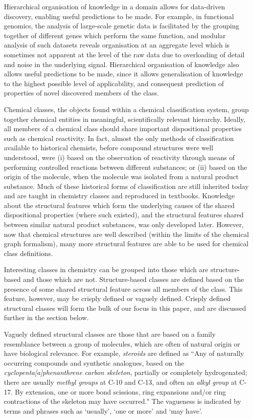 \documentclass[10pt]{bmc_article}
\newenvironment{bmcformat}{\baselineskip20pt\sloppy\setboolean{publ}{false}}{\baselineskip20pt\sloppy}
\begin{document}
\begin{bmcformat}
Hierarchical organisation of knowledge in a domain allows for data-driven discovery, enabling useful predictions to be made.  For example, in functional genomics, the analysis of large-scale genetic data is facilitated by the grouping together of different genes which perform the same function, and modular analysis of such datasets reveals organisation at an aggregate level which is sometimes not apparent at the level of the raw data due to overloading of detail and noise in the underlying signal. Hierarchical organisation of knowledge also allows useful predictions to be made, since it allows generalisation of knowledge to the highest possible level of applicability, and consequent prediction of properties of novel discovered members of the class.  

Chemical classes, the objects found within a chemical classification system, group together chemical entities in meaningful, scientifically relevant hierarchy. Ideally, all members of a chemical class should share important dispositional properties such as chemical reactivity. In fact, almost the only methods of classification available to historical chemists, before compound structures were well understood, were (i) based on the observation of reactivity through means of performing controlled reactions between different substances; or (ii) based on the origin of the molecule, when the molecule was isolated from a natural product substance. Much of these historical forms of classification are still inherited today and are taught in chemistry classes and reproduced in textbooks. Knowledge about the structural features which form the underlying causes of the shared dispositional properties (where such existed), and the structural features shared between similar natural product substances, was only developed later. However, now that chemical structures are well described (within the limits of the chemical graph formalism), many more structural features are able to be used for chemical class definitions. 

Interesting classes in chemistry can be grouped into those which are structure-based and those which are not. Structure-based classes are defined based on the presence of some shared structural feature across all members of the class.  This feature, however, may be crisply defined or vaguely defined.  Crisply defined structural classes will form the bulk of our focus in this paper, and are discussed further in the section \textit{} below.   

Vaguely defined structural classes are those that are based on a family resemblance between a group of molecules, which are often of natural origin or have biological relevance.  For example, \textit{steroids} are defined as ``Any of naturally occurring compounds and synthetic analogues, based on the \textit{cyclopenta[a]phenanthrene carbon skeleton}, partially or completely hydrogenated; there are usually \textit{methyl groups} at C-10 and C-13, and often an \textit{alkyl group} at C-17. By extension, one or more bond scissions, ring expansions and/or ring contractions of the skeleton may have occurred."  The vagueness is indicated by terms and phrases such as `usually', `one or more' and `may have'.


\end{bmcformat}
\end{document}
